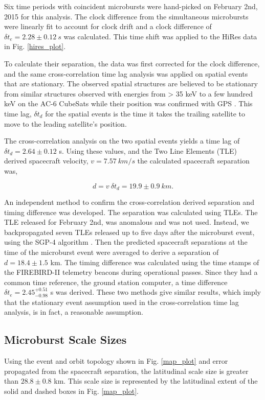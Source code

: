 \documentclass[draft,linenumbers]{agujournal}
\begin{document}
Six time periods with coincident microbursts were hand-picked on February 2nd, 2015 for this analysis. The clock difference from the simultaneous microbursts were linearly fit to account for clock drift and a clock difference of $\delta t_{e} = 2.28 \pm 0.12 \ s$ was calculated. This time shift was applied to the HiRes data in Fig. \ref{hires_plot}.

To calculate their separation, the data was first corrected for the clock difference, and the same cross-correlation time lag analysis was applied on spatial events that are stationary. The observed spatial structures are believed to be stationary from similar structures observed with energies from > 35 keV to a few hundred keV on the AC-6 CubeSats while their position was confirmed with GPS \citep{Blake16}. This time lag, $\delta t_{d}$ for the spatial events is the time it takes the trailing satellite to move to the leading satellite's position.

The cross-correlation analysis on the two spatial events yields a time lag of $\delta t_{d} = 2.64 \pm 0.12$ s. Using these values, and the Two Line Elements (TLE) derived spacecraft velocity, $v = 7.57 \ km/s$ the calculated spacecraft separation was,

\begin{equation}
d = v \ \delta t_{d} = 19.9 \pm 0.9 \ km.
\end{equation}

An independent method to confirm the cross-correlation derived separation and timing difference was developed. The separation was calculated using TLEs. The TLE released for February 2nd, was anomalous and was not used. Instead, we backpropagated seven TLEs released up to five days after the microburst event, using the SGP-4 algorithm \citep{sgp4}. Then the predicted spacecraft separations at the time of the microburst event were averaged to derive a separation of $d = 18.4 \pm 1.5$ km. The timing difference was calculated using the time stamps of the FIREBIRD-II telemetry beacons during operational passes. Since they had a common time reference, the ground station computer, a time difference $\delta t_{e}  = 2.45^{+ 0.51}_{-0.98}$ s was derived. These two methods give similar results, which imply that the stationary event assumption used in the cross-correlation time lag analysis, is in fact, a reasonable assumption.

\subsection{Microburst Scale Sizes} \label{scale_size} %
Using the event and orbit topology shown in Fig. \ref{map_plot} and error propagated from the spacecraft separation, the latitudinal scale size is greater than $ 28.8 \pm 0.8$ km. This scale size is represented by the latitudinal extent of the solid and dashed boxes in Fig. \ref{map_plot}.
\end{document}
